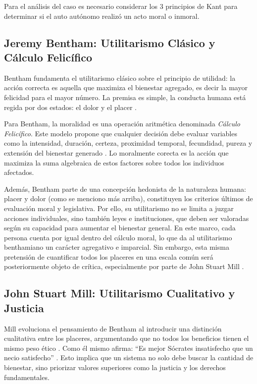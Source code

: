 \medskip

Para el análisis del caso es necesario considerar los 3 principios de Kant para determinar si el auto autónomo realizó un acto moral o inmoral.

\subsection{Jeremy Bentham: Utilitarismo Clásico y Cálculo Felicífico}
Bentham fundamenta el utilitarismo clásico sobre el principio de utilidad: la acción correcta es aquella que maximiza el bienestar agregado, es decir la mayor felicidad para el mayor número. La premisa es simple, la conducta humana está regida por dos estados: el dolor y el placer \citep{schofield2020jeremy}. 

Para Bentham, la moralidad es una operación aritmética denominada \textit{Cálculo Felicífico}. Este modelo propone que cualquier decisión debe evaluar variables como la intensidad, duración, certeza, proximidad  temporal, fecundidad, pureza y extensión del bienestar generado \citep{quinn2014bentham}. Lo moralmente corecta es la acción que maximiza la suma algebraica de estos factores sobre todos los individuos afectados.

Además, Bentham parte de una concepción hedonista de la naturaleza humana: placer y dolor (como se menciono más arriba), constituyen los criterios últimos de evaluación moral y legislativa. Por ello, su utilitarismo no se limita a juzgar acciones individuales, sino también leyes e instituciones, que deben ser valoradas según su capacidad para aumentar el bienestar general. En este marco, cada persona cuenta por igual dentro del cálculo moral, lo que da al utilitarismo benthamiano un carácter agregativo e imparcial. Sin embargo, esta misma pretensión de cuantificar todos los placeres en una escala común será posteriormente objeto de crítica, especialmente por parte de John Stuart Mill \citep{iepBentham}.

\subsection{John Stuart Mill: Utilitarismo Cualitativo y Justicia}
Mill evoluciona el pensamiento de Bentham al introducir una distinción cualitativa entre los placeres, argumentando que no todos los beneficios tienen el mismo peso ético \citep{west2003introduction}. Como él mismo afirma: ``Es mejor Sócrates insatisfecho que un necio satisfecho'' \citep{mill2014utilitarismo}. Esto implica que un sistema no solo debe buscar la cantidad de bienestar, sino priorizar valores superiores como la justicia y los derechos fundamentales.

